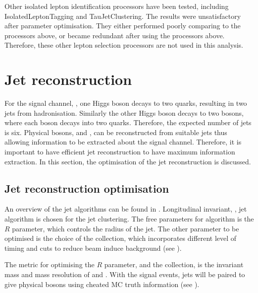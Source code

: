 Other isolated lepton identification processors have been tested, including IsolatedLeptonTagging and TauJetClustering. The results were unsatisfactory after parameter optimisation. They either performed poorly comparing to the processors above, or became redundant after using the processors above. Therefore, these other lepton selection processors are not used in this analysis.

\section{Jet reconstruction}

For the signal channel, \eeToHHbbWWHad, one Higgs boson decays to two \Pbottom quarks, resulting in two jets from hadronisation. Similarly the other Higgs boson decays to two \PW bosons, where each \PW boson decays into two quarks. Therefore, the expected number of jets is six.  Physical bosons,  \PW and \PHiggs, can be reconstructed from suitable jets thus allowing information to be extracted about the signal channel. Therefore, it is important to have efficient jet reconstruction to have maximum information extraction. In this section, the optimisation of the jet reconstruction is discussed.


\subsection{Jet reconstruction optimisation}
\label{sec:doubleHiggsJetOptimisation}
An overview of the jet algorithms can be found in . Longitudinal invariant, \kt, jet algorithm is chosen for the jet clustering. The free parameters for \kt algorithm is the $R$ parameter, which controls the radius of the jet. The other parameter to be optimised is the choice of the \PFO collection, which incorporates different level of timing and \pT cuts to reduce beam induce background (see ).

The metric for optimising the $R$ parameter, and the \PFO collection, is the invariant mass and mass resolution of \PHiggs and \PW. With the signal events, jets will be paired to give physical bosons using cheated MC truth information (see ).

